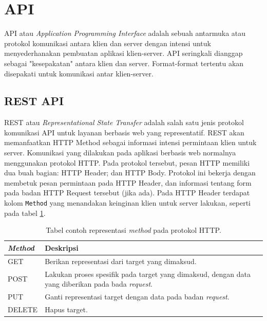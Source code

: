     
\section{API}
    API atau \textit{Application Programming Interface} adalah sebuah antarmuka
    atau protokol komunikasi antara klien dan server dengan intensi untuk
    menyederhanakan pembuatan aplikasi klien-server. API seringkali dianggap
    sebagai "kesepakatan" antara klien dan server. Format-format tertentu akan
    disepakati untuk komunikasi antar klien-server\cite{health-informatics}.
    
    \subsection{REST API}
    REST atau \textit{Representational State Transfer} adalah salah satu jenis
    protokol komunikasi API untuk layanan berbasis web yang
    representatif\cite{rest:roy-fielding}. REST akan memanfaatkan HTTP Method
    sebagai informasi intensi permintaan klien untuk server. Komunikasi yang
    dilakukan pada aplikasi berbasis web normalnya menggunakan protokol HTTP.
    Pada protokol tersebut, pesan HTTP memiliki dua buah bagian: HTTP Header;
    dan HTTP Body\cite{RFC7231}. Protokol ini bekerja dengan membetuk pesan
    permintaan pada HTTP Header, dan informasi tentang form pada badan HTTP
    Request tersebut (jika ada). Pada HTTP Header terdapat kolom \texttt{Method}
    yang menandakan keinginan klien untuk server lakukan, seperti pada tabel
    \ref{tab:http_method}\cite[P.~21]{RFC7231}.
    
    \begin{table}[]
    \centering
    \begin{tabular}{| p{3cm} | p{5cm} |}
    \hline
    \textit{Method} & Deskripsi                                                                                        \\ \hline
    GET             & Berikan representasi dari target yang dimaksud.                                                  \\ \hline
    POST            & Lakukan proses spesifik pada target yang dimaksud, dengan 
                        data yang diberikan pada bada \textit{request}. \\ \hline
    PUT             & Ganti representasi target dengan data pada badan \textit{request}.                                        \\ \hline
    DELETE          & Hapus target.                                                                                    \\ \hline
    \end{tabular}
    \caption{Tabel contoh representasi \textit{method} pada protokol HTTP.}
    \label{tab:http_method}
    \end{table}
    

